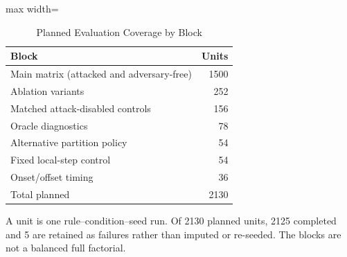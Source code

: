 \begin{table}[!t]
\centering\footnotesize
\setlength{\tabcolsep}{4pt}
\caption{Planned Evaluation Coverage by Block}\label{tab:coverage}
\begin{adjustbox}{max width=\columnwidth}
\begin{tabular}{lr}
\toprule
Block & Units \\
\midrule
Main matrix (attacked and adversary-free) & 1500 \\
Ablation variants & 252 \\
Matched attack-disabled controls & 156 \\
Oracle diagnostics & 78 \\
Alternative partition policy & 54 \\
Fixed local-step control & 54 \\
Onset/offset timing & 36 \\
Total planned & 2130 \\
\bottomrule
\end{tabular}
\end{adjustbox}

\par\vspace{3pt}\parbox{\linewidth}{\footnotesize A unit is one rule--condition--seed run. Of 2130 planned units, 2125 completed and 5 are retained as failures rather than imputed or re-seeded. The blocks are not a balanced full factorial.}
\end{table}
